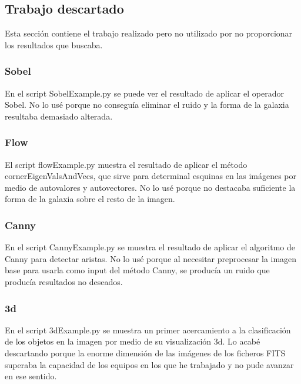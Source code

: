 \documentclass[a4paper,12pt]{article}
\begin{document}
\subsection{Trabajo descartado}
Esta sección contiene el trabajo realizado pero no utilizado por no proporcionar los resultados que buscaba. %
\subsubsection{Sobel}
En el script SobelExample.py se puede ver el resultado de aplicar el operador Sobel. No lo usé porque no conseguía eliminar el ruido y la forma de la galaxia resultaba demasiado alterada.
\subsubsection{Flow}
El script flowExample.py muestra el resultado de aplicar el método cornerEigenValsAndVecs, que sirve para determinal esquinas en las imágenes por medio de autovalores y autovectores. No lo usé porque no destacaba suficiente la forma de la galaxia sobre el resto de la imagen.
\subsubsection{Canny}
En el script CannyExample.py se muestra el resultado de aplicar el algoritmo de Canny para detectar aristas. No lo usé porque al necesitar preprocesar la imagen base para usarla como input del método Canny, se producía un ruido que producía resultados no deseados.
\subsubsection{3d}
En el script 3dExample.py se muestra un primer acercamiento a la clasificación de los objetos en la imagen por medio de su visualización 3d. Lo acabé descartando porque la enorme dimensión de las imágenes de los ficheros FITS superaba la capacidad de los equipos en los que he trabajado y no pude avanzar en ese sentido.

\renewcommand\refname{Bibliografía y referencias}


\end{document}
